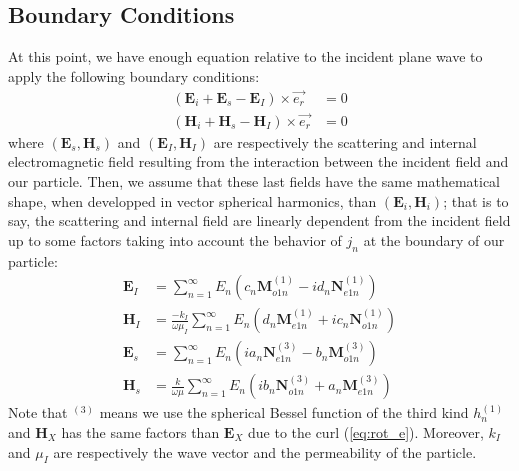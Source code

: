 \documentclass{article}
\numberwithin{equation}{section}
\begin{document}
\subsection{Boundary Conditions}

At this point, we have enough equation relative to the incident plane wave to apply the following boundary conditions:
\begin{align}\label{eq:boundaries}
(\textbf{E}_{i} + \textbf{E}_{s} - \textbf{E}_{I}) \times \overrightarrow{e_{r}} &= 0\\
(\textbf{H}_{i} + \textbf{H}_{s} - \textbf{H}_{I}) \times \overrightarrow{e_{r}} &= 0
\end{align}
where $(\textbf{E}_{s}, \textbf{H}_{s})$ and $(\textbf{E}_{I}, \textbf{H}_{I})$ are respectively the scattering and internal electromagnetic field resulting from the interaction between the incident field and our particle. Then, we assume that these last fields have the same mathematical shape, when developped in vector spherical harmonics, than $(\textbf{E}_{i}, \textbf{H}_{i})$; that is to say, the scattering and internal field are linearly dependent from the incident field up to some factors taking into account the behavior of $j_{n}$ at the boundary of our particle:
\begin{align}
\textbf{E}_{I}&=\sum_{n=1}^{\infty }E_{n}(c_{n}\textbf{M}^{(1)}_{o1n} - id_{n}\textbf{N}^{(1)}_{e1n})\\
\textbf{H}_{I}&=\frac{-k_{I}}{\omega\mu_{I}}\sum_{n=1}^{\infty }E_{n}(d_{n}\textbf{M}^{(1)}_{e1n} + ic_{n}\textbf{N}^{(1)}_{o1n})\\
\textbf{E}_{s}&=\sum_{n=1}^{\infty }E_{n}(ia_{n}\textbf{N}^{(3)}_{e1n} - b_{n}\textbf{M}^{(3)}_{o1n})\\
\textbf{H}_{s}&=\frac{k}{\omega\mu}\sum_{n=1}^{\infty }E_{n}(ib_{n}\textbf{N}^{(3)}_{o1n} + a_{n}\textbf{M}^{(3)}_{e1n})
\end{align}
Note that $^{(3)}$ means we use the spherical Bessel function of the third kind $h^{(1)}_{n}$ and $\textbf{H}_{X}$ has the same factors than $\textbf{E}_{X}$ due to the curl (\ref{eq:rot_e}). Moreover, $k_{I}$ and $\mu_{I}$ are respectively the wave vector and the permeability of the particle.
\end{document}
